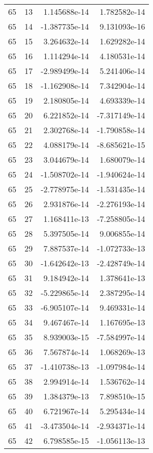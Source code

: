 \begin{tabular}{rrrr}
  65 &   13 &  1.145688e-14 &  1.782582e-14 \\
  65 &   14 & -1.387735e-14 &  9.131093e-16 \\
  65 &   15 &  3.264632e-14 &  1.629282e-14 \\
  65 &   16 &  1.114294e-14 &  4.180531e-14 \\
  65 &   17 & -2.989499e-14 &  5.241406e-14 \\
  65 &   18 & -1.162908e-14 &  7.342904e-14 \\
  65 &   19 &  2.180805e-14 &  4.693339e-14 \\
  65 &   20 &  6.221852e-14 & -7.317149e-14 \\
  65 &   21 &  2.302768e-14 & -1.790858e-14 \\
  65 &   22 &  4.088179e-14 & -8.685621e-15 \\
  65 &   23 &  3.044679e-14 &  1.680079e-14 \\
  65 &   24 & -1.508702e-14 & -1.940624e-14 \\
  65 &   25 & -2.778975e-14 & -1.531435e-14 \\
  65 &   26 &  2.931876e-14 & -2.276193e-14 \\
  65 &   27 &  1.168411e-13 & -7.258805e-14 \\
  65 &   28 &  5.397505e-14 &  9.006855e-14 \\
  65 &   29 &  7.887537e-14 & -1.072733e-13 \\
  65 &   30 & -1.642642e-13 & -2.428749e-14 \\
  65 &   31 &  9.184942e-14 &  1.378641e-13 \\
  65 &   32 & -5.229865e-14 &  2.387295e-14 \\
  65 &   33 & -6.905107e-14 &  9.469331e-14 \\
  65 &   34 &  9.467467e-14 &  1.167695e-13 \\
  65 &   35 &  8.939003e-15 & -7.584997e-14 \\
  65 &   36 &  7.567874e-14 &  1.068269e-13 \\
  65 &   37 & -1.410738e-13 & -1.097984e-14 \\
  65 &   38 &  2.994914e-14 &  1.536762e-14 \\
  65 &   39 &  1.384379e-13 &  7.898510e-15 \\
  65 &   40 &  6.721967e-14 &  5.295434e-14 \\
  65 &   41 & -3.473504e-14 & -2.934371e-14 \\
  65 &   42 &  6.798585e-15 & -1.056113e-13 \\

\end{tabular}
